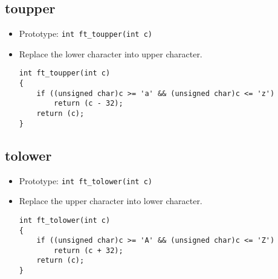 \documentclass{article}
\begin{document}
	\subsection{toupper}
		\begin{itemize}[label=$\rightarrow$]
			\item Prototype: \texttt{int ft\_toupper(int c)}
			\item Replace the lower character into upper character.
			\begin{verbatim}
int ft_toupper(int c)                                                           
{                                                                               
    if ((unsigned char)c >= 'a' && (unsigned char)c <= 'z')                     
        return (c - 32);                                                        
    return (c);                                                                 
}
			\end{verbatim}
		\end{itemize}
		
	\subsection{tolower}
		\begin{itemize}[label=$\rightarrow$]
			\item Prototype: \texttt{int ft\_tolower(int c)}
			\item Replace the upper character into lower character.
			\begin{verbatim}
int ft_tolower(int c)                                                           
{                                                                               
    if ((unsigned char)c >= 'A' && (unsigned char)c <= 'Z')                     
        return (c + 32);                                                        
    return (c);                                                                 
}
			\end{verbatim}
		\end{itemize}
	
\end{document}
